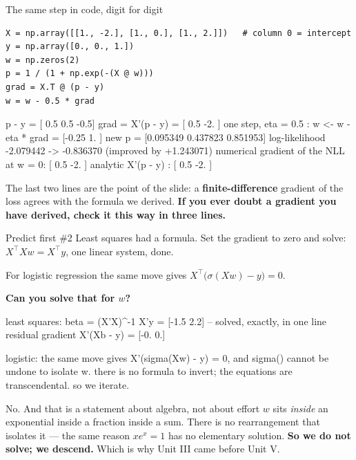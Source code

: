 \documentclass[aspectratio=169]{beamer}
\begin{document}
\begin{frame}[fragile,shrink=6]{The same step in code, digit for digit}
\begin{lstlisting}
X = np.array([[1., -2.], [1., 0.], [1., 2.]])   # column 0 = intercept
y = np.array([0., 0., 1.])
w = np.zeros(2)
p = 1 / (1 + np.exp(-(X @ w)))
grad = X.T @ (p - y)
w = w - 0.5 * grad
\end{lstlisting}
\begin{outblk}
p - y            = [ 0.5  0.5 -0.5]
grad = X'(p - y) = [ 0.5 -2. ]
one step, eta = 0.5 :  w <- w - eta * grad = [-0.25  1.  ]
new p = [0.095349 0.437823 0.851953]
log-likelihood  -2.079442 -> -0.836370   (improved by +1.243071)
numerical gradient of the NLL at w = 0: [ 0.5 -2. ]
analytic  X'(p - y)                   : [ 0.5 -2. ]
\end{outblk}
\begin{center}\small
  The last two lines are the point of the slide: a \textbf{finite-difference}
  gradient of the loss agrees with the formula we derived. \textbf{If you
  ever doubt a gradient you have derived, check it this way in three lines.}
\end{center}
\end{frame}

\begin{frame}[fragile,shrink=8]{Predict first \#2}
Least squares had a formula. Set the gradient to zero and solve:
$X^{\!\top}Xw = X^{\!\top}y$, one linear system, done.

For logistic regression the same move gives
$X^{\!\top}\bigl(\sigma(Xw) - y\bigr) = 0$.

\begin{center}
  \textbf{Can you solve that for $w$?}
\end{center}
\vspace{0.2em}
\begin{outblk}
least squares: beta = (X'X)^-1 X'y = [-1.5  2.2]  -- solved, exactly, in one line
residual gradient X'(Xb - y) = [-0.  0.]

logistic: the same move gives  X'(sigma(Xw) - y) = 0,
          and sigma() cannot be undone to isolate w.
   there is no formula to invert; the equations are transcendental.
   so we iterate.
\end{outblk}
\begin{alertblock}{No. And that is a statement about algebra, not about effort}
  \footnotesize $w$ sits \emph{inside} an exponential inside a fraction
  inside a sum. There is no rearrangement that isolates it --- the same
  reason $x e^{x} = 1$ has no elementary solution. \textbf{So we do not
  solve; we descend.} Which is why Unit III came before Unit V.
\end{alertblock}
\end{frame}
\end{document}
